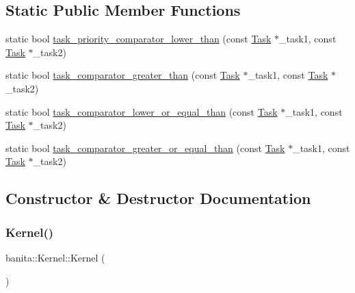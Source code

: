 \subsection*{Static Public Member Functions}
\begin{DoxyCompactItemize}
\item 
static bool \mbox{\hyperlink{classbanita_1_1_kernel_a32e78faeb3605d236939d4e7182fae23}{task\+\_\+priority\+\_\+comparator\+\_\+lower\+\_\+than}} (const \mbox{\hyperlink{classbanita_1_1_task}{Task}} $\ast$\+\_\+task1, const \mbox{\hyperlink{classbanita_1_1_task}{Task}} $\ast$\+\_\+task2)
\item 
static bool \mbox{\hyperlink{classbanita_1_1_kernel_a7bddd1303197058cc83fb4c78adfe2d8}{task\+\_\+comparator\+\_\+greater\+\_\+than}} (const \mbox{\hyperlink{classbanita_1_1_task}{Task}} $\ast$\+\_\+task1, const \mbox{\hyperlink{classbanita_1_1_task}{Task}} $\ast$\+\_\+task2)
\item 
static bool \mbox{\hyperlink{classbanita_1_1_kernel_a84ff44eb0c0d6d01073e01b1aa2c6c55}{task\+\_\+comparator\+\_\+lower\+\_\+or\+\_\+equal\+\_\+than}} (const \mbox{\hyperlink{classbanita_1_1_task}{Task}} $\ast$\+\_\+task1, const \mbox{\hyperlink{classbanita_1_1_task}{Task}} $\ast$\+\_\+task2)
\item 
static bool \mbox{\hyperlink{classbanita_1_1_kernel_a4f86a08b65bb2dee12329ddb9ec127a9}{task\+\_\+comparator\+\_\+greater\+\_\+or\+\_\+equal\+\_\+than}} (const \mbox{\hyperlink{classbanita_1_1_task}{Task}} $\ast$\+\_\+task1, const \mbox{\hyperlink{classbanita_1_1_task}{Task}} $\ast$\+\_\+task2)
\end{DoxyCompactItemize}


\subsection{Constructor \& Destructor Documentation}
\mbox{\label{classbanita_1_1_kernel_a07f2a762b74482c2e384c84531151cf4}} 
\subsubsection{\texorpdfstring{Kernel()}{Kernel()}\hspace{0.1cm}{\footnotesize\ttfamily [1/2]}}
{\footnotesize\ttfamily banita\+::\+Kernel\+::\+Kernel (\begin{DoxyParamCaption}{ }\end{DoxyParamCaption})\hspace{0.3cm}{\ttfamily [inline]}}



